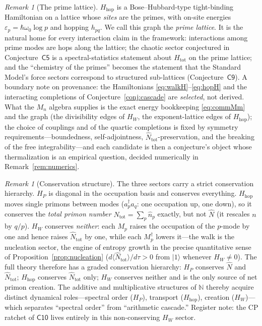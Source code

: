 \documentclass[11pt,a4paper]{article}
\theoremstyle{plain}
\theoremstyle{definition}
\theoremstyle{remark}
\newtheorem{remark}[theorem]{Remark}
\newcommand{\ket}[1]{\lvert #1\rangle}
\newcommand{\Nn}{\mathbb{N}}
\newcommand{\Nhat}{\widehat{N}}
\begin{document}
\begin{remark}[The prime lattice]
$H_{\mathrm{hop}}$ is a Bose--Hubbard-type tight-binding Hamiltonian on a lattice whose
\emph{sites} are the primes, with on-site energies $\varepsilon_{p}=\hbar\omega_{0}\log p$ and
hopping $h_{pq}$. We call this graph the \emph{prime lattice}. It is the natural home for
every interaction claim in the framework: interactions among prime modes are hops along the
lattice; the chaotic sector conjectured in Conjecture~$\mathsf{C5}$ is a spectral-statistics
statement about $H_{\mathrm{tot}}$ on the prime lattice; and the ``chemistry of the
primes'' becomes the statement that the Standard Model's force sectors correspond
to structured sub-lattices (Conjecture~$\mathsf{C9}$). A boundary note on provenance: the
Hamiltonians \eqref{eq:walkH}--\eqref{eq:hopH} and the interacting completions of
Conjecture~\ref{conj:cascade} are \emph{selected}, not derived. What the $M_{n}$ algebra
supplies is the exact energy bookkeeping \eqref{eq:commMm} and the graph (the divisibility
edges of $H_{W}$, the exponent-lattice edges of $H_{\mathrm{hop}}$); the choice of couplings
and of the quartic completions is fixed by symmetry requirements---boundedness,
self-adjointness, $\Nhat_{\mathrm{tot}}$-preservation, and the breaking of the free
integrability---and each candidate is then a conjecture's object whose thermalization is an
empirical question, decided numerically in Remark~\ref{rem:numerics}.
\end{remark}

\begin{remark}[Conservation structure]\label{rem:conservation}
The three sectors carry a strict conservation hierarchy. $H_{P}$ is diagonal in the occupation
basis and conserves everything. $H_{\mathrm{hop}}$ moves single primons between modes
($a_{p}^{\dagger}a_{q}$: one occupation up, one down), so it conserves the \emph{total primon
number} $\Nhat_{\mathrm{tot}}=\sum_{p}\hat n_{p}$ exactly, but not $\Nhat$ (it rescales $n$ by
$q/p$). $H_{W}$ conserves \emph{neither}: each $M_{p}$ raises the occupation of the $p$-mode by
one and hence raises $\Nhat_{\mathrm{tot}}$ by one, while each $M_{p}^{\dagger}$ lowers it---the
walk is the nucleation sector, the engine of entropy growth in the precise quantitative sense
of Proposition~\ref{prop:nucleation} ($d\langle\Nhat_{\mathrm{tot}}\rangle/d\tau>0$ from
$\ket{1}$ whenever $H_{W}\neq0$). The full theory therefore has a graded conservation
hierarchy: $H_{P}$ conserves $\Nhat$ and $\Nhat_{\mathrm{tot}}$; $H_{\mathrm{hop}}$ conserves
$\Nhat_{\mathrm{tot}}$ only; $H_{W}$ conserves neither and is the only source of net primon
creation. The additive and multiplicative structures of $\Nn$ thereby acquire distinct
dynamical roles---spectral order ($H_{P}$), transport ($H_{\mathrm{hop}}$), creation
($H_{W}$)---which separates ``spectral order'' from
``arithmetic cascade.'' Register note: the CP ratchet of $\mathsf{C10}$ lives entirely in this
non-conserving $H_{W}$ sector.
\end{remark}
\end{document}
